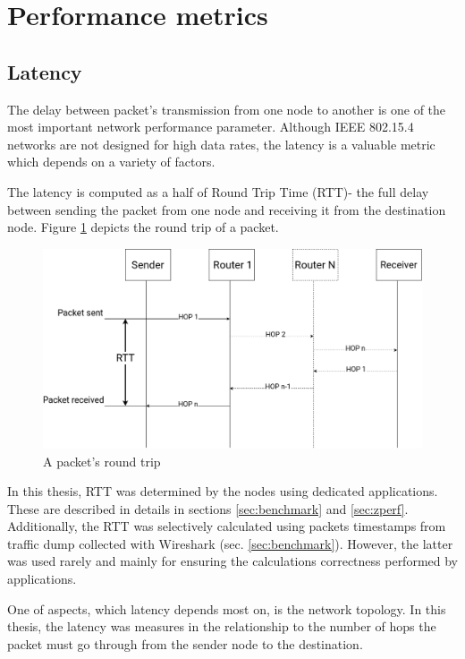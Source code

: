

\section{Performance metrics}
\label{sec:performance-metrics}
\subsection*{Latency}

The delay between packet's transmission from one node to another is one of the 
most important network performance parameter. Although IEEE 802.15.4 networks are not
designed for high data rates, the latency is a valuable metric which depends on a variety of 
factors.

The latency is computed as a half of Round Trip Time (RTT)- the full delay between sending the packet from one node and receiving it from the destination node. Figure \ref{fig:round_trip}  depicts the round trip of a packet.
\vspace{2em}

\begin{figure} [H]
    \centering
    \includegraphics[scale=0.3]{images/rtt-diagram.png}
    \caption{A packet's round trip}
    \label{fig:round_trip}
\end{figure}

In this thesis, RTT was determined by the nodes using dedicated applications. These are described in 
details in sections \ref{sec:benchmark} and \ref{sec:zperf}. Additionally, the RTT was selectively 
calculated using packets timestamps from traffic dump collected with Wireshark (sec. 
\ref{sec:benchmark}). However, the latter was used rarely and mainly for ensuring the
calculations correctness performed by applications.

One of aspects, which latency depends most on, is the network topology. In this thesis,
the latency was measures in the relationship to the number of hops the packet must go through 
from the sender node to the destination.

